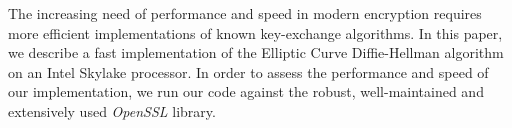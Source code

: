 The increasing need of performance and speed in modern encryption requires more efficient implementations of known key-exchange algorithms. In this paper, we describe a fast implementation of the Elliptic Curve Diffie-Hellman algorithm on an Intel Skylake processor. In order to assess the performance and speed of our implementation, we run our code against the robust, well-maintained and extensively used \textit{OpenSSL} library.